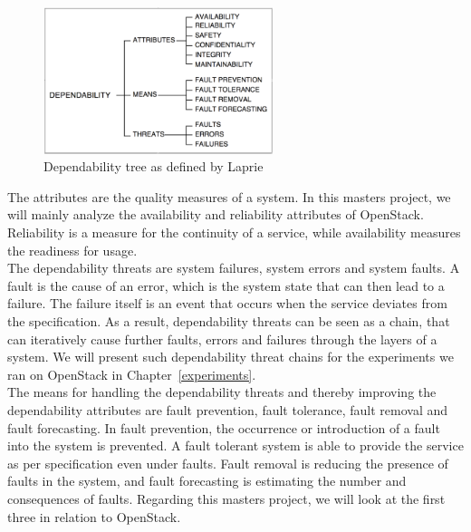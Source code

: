\begin{figure}[h]
	\centering
		\includegraphics[width=0.60\textwidth]{images/dependability_tree.PNG}
	\caption{Dependability tree as defined by Laprie}
	\label{fig:dependability_tree}
\end{figure}

The attributes are the quality measures of a system. In this masters project, we will mainly analyze the availability and reliability attributes of OpenStack. Reliability is a measure for the continuity of a service, while availability measures the readiness for usage.\\

The dependability threats are system failures, system errors and system faults. A fault is the cause of an error, which is the system state that can then lead to a failure. The failure itself is an event that occurs when the service deviates from the specification. As a result, dependability threats can be seen as a chain, that can iteratively cause further faults, errors and failures through the layers of a system. We will present such dependability threat chains for the experiments we ran on OpenStack in Chapter~\ref{experiments}. \\

The means for handling the dependability threats and thereby improving the dependability attributes are fault prevention, fault tolerance, fault removal and fault forecasting. In fault prevention, the occurrence or introduction of a fault into the system is prevented. A fault tolerant system is able to provide the service as per specification even under faults. Fault removal is reducing the presence of faults in the system, and fault forecasting is estimating the number and consequences of faults. Regarding this masters project, we will look at the first three in relation to OpenStack.

